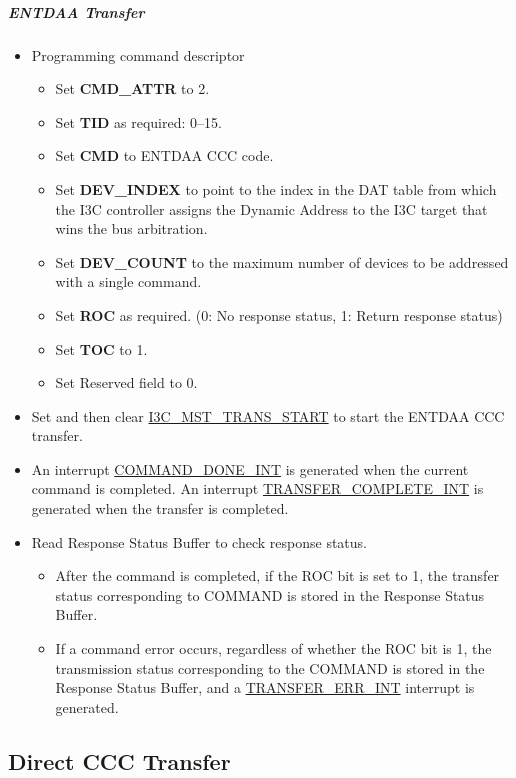 \documentclass[main\_\_EN.tex]{subfiles}
\begin{document}
\subparagraph{ENTDAA Transfer}
\begin{itemize}
    \item Programming command descriptor
    \begin{itemize}
        \item Set \textbf{CMD\_ATTR} to 2.
        \item Set \textbf{TID} as required: 0–15.
        \item Set \textbf{CMD} to ENTDAA CCC code.
        \item Set \textbf{DEV\_INDEX} to point to the index in the DAT table from which the I3C controller assigns the Dynamic Address to the I3C target that wins the bus arbitration.
        \item Set \textbf{DEV\_COUNT} to the maximum number of devices to be addressed with a single command.
        \item Set \textbf{ROC} as required. (0: No response status, 1: Return response status)
        \item Set \textbf{TOC} to 1.
        \item Set Reserved field to 0.
    \end{itemize}
    \item Set and then clear \hyperref[fielddesc:I3CMSTREGTRANSSTART]{I3C\_MST\_TRANS\_START} to start the ENTDAA CCC transfer.
    \item An interrupt \hyperref[int:COMMANDDONEINT]{COMMAND\_DONE\_INT} is generated when the current command is completed. An interrupt \hyperref[int:TRANSFERCOMPLETEINT]{TRANSFER\_COMPLETE\_INT} is generated when the transfer is completed.
    \item Read Response Status Buffer to check response status.
    \begin{itemize}
        \item After the command is completed, if the ROC bit is set to 1, the transfer status corresponding to COMMAND is stored in the Response Status Buffer.
        \item If a command error occurs, regardless of whether the ROC bit is 1, the transmission status corresponding to the COMMAND is stored in the Response Status Buffer, and a \hyperref[int:TRANSFERERRINT]{TRANSFER\_ERR\_INT} interrupt is generated.
    \end{itemize}
\end{itemize}


\subsection{Direct CCC Transfer}
\end{document}
